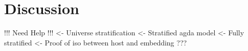 \section{Discussion}

\begin{structure}
!!! Need Help !!!
<- Universe stratification
    <- Stratified agda model
        <- Fully stratified
        <- Proof of iso between host and embedding
    ???
\end{structure}
